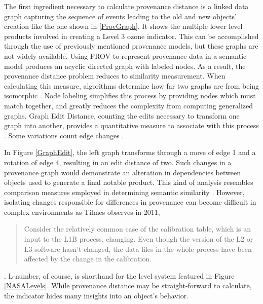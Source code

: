 The first ingredient necessary to calculate provenance distance is a linked data graph capturing the sequence of events leading to the old and new objects' creation like the one shown in \ref{ProvGraph}.
It shows the multiple lower level products involved in creating a Level 3 ozone indicator.
This can be accomplished through the use of previously mentioned provenance models, but these graphs are not widely available.
Using PROV to represent provenance data in a semantic model produces an acyclic directed graph with labeled nodes.
As a result, the provenance distance problem reduces to similarity measurement.
When calculating this measure, algorithms determine how far two graphs are from being isomorphic \cite{Cao2013}.
Node labeling simplifies this process by providing nodes which must match together, and greatly reduces the complexity from computing generalized graphs.
Graph Edit Distance, counting the edits necessary to transform one graph into another, provides a quantitative measure to associate with this process  \cite{Gao2010}.
Some variations count edge changes \cite{Goddard:1996:DGU:246962.246972}.

In Figure \ref{GraphEdit}, the left graph transforms through a move of edge 1 and a rotation of edge 4, resulting in an edit distance of two.
Such changes in a provenance graph would demonstrate an alteration in dependencies between objects used to generate a final notable product.
This kind of analysis resembles comparison measures employed in determining semantic similarity \cite{Hliaoutakis06informationretrieval}.
However, isolating changes responsible for differences in provenance can become difficult in complex environments as Tilmes observes in 2011, 
\begin{quotation}
	Consider the relatively common case of the calibration table, which is an input to the L1B process, changing. Even though the version of the L2 or L3 software hasn’t changed, the data files in the whole process have been affected by the change in the calibration.
\end{quotation} \cite{TILMES2011548}.
L-number, of course, is shorthand for the level system featured in Figure \ref{NASALevels}.
While provenance distance may be straight-forward to calculate, the indicator hides many insights into an object's behavior.

